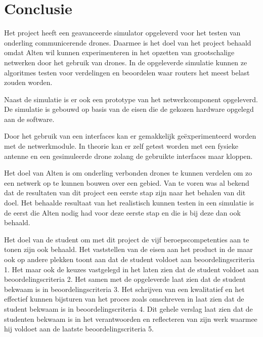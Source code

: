 \documentclass[a4paper, 11pt, oneside]{report}
\begin{document}
\chapter{Conclusie}\label{sec:conclusie}
Het project heeft een geavanceerde simulator opgeleverd voor het testen van onderling communicerende drones.
Daarmee is het doel van het project behaald omdat Alten wil kunnen experimenteren in het opzetten van grootschalige netwerken door het gebruik van drones.
In de opgeleverde simulatie kunnen ze algoritmes testen voor verdelingen en beoordelen waar routers het meest belast zouden worden.

Naast de simulatie is er ook een prototype van het netwerkcomponent opgeleverd. 
De simulatie is gebouwd op basis van de eisen die de gekozen hardware opgelegd aan de software.
 
Door het gebruik van een interfaces kan er gemakkelijk geëxperimenteerd worden met de netwerkmodule.
In theorie kan er zelf getest worden met een fysieke antenne en een gesimuleerde drone zolang de gebruikte interfaces maar kloppen.

Het doel van Alten is om onderling verbonden drones te kunnen verdelen om zo een netwerk op te kunnen bouwen over een gebied.
Van te voren was al bekend dat de resultaten van dit project een eerste stap zijn naar het behalen van dit doel.
Het behaalde resultaat van het realistisch kunnen testen in een simulatie is de eerst die Alten nodig had voor deze eerste stap en die is bij deze dan ook behaald.

Het doel van de student om met dit project de vijf beroepscompetenties aan te tonen zijn ook behaald. Het vaststellen van de eisen aan het product in de  maar ook op andere plekken toont aan dat de student voldoet aan beoordelingscriteria 1. Het  maar ook de keuzes vastgelegd in het  laten zien dat de student voldoet aan beoordelingscriteria 2. Het  samen met de opgeleverde  laat zien dat de student bekwaam is in beoordelingscriteria 3. Het schrijven van een kwalitatief  en het effectief kunnen bijsturen van het proces zoals omschreven in  laat zien dat de student bekwaam is in beoordelingscriteria 4.
Dit gehele verslag laat zien dat de studenten bekwaam is in het verantwoorden en reflecteren van zijn werk waarmee hij voldoet aan de laatste beoordelingscriteria 5.
\end{document}
